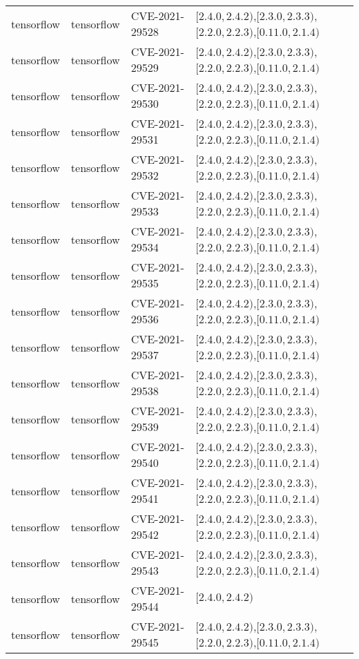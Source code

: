 \begin{tabular}{llll}
tensorflow & tensorflow & CVE-2021-29528 & $[2.4.0,2.4.2)$,$[2.3.0,2.3.3)$,$[2.2.0,2.2.3)$,$[0.11.0,2.1.4)$ \\
tensorflow & tensorflow & CVE-2021-29529 & $[2.4.0,2.4.2)$,$[2.3.0,2.3.3)$,$[2.2.0,2.2.3)$,$[0.11.0,2.1.4)$ \\
tensorflow & tensorflow & CVE-2021-29530 & $[2.4.0,2.4.2)$,$[2.3.0,2.3.3)$,$[2.2.0,2.2.3)$,$[0.11.0,2.1.4)$ \\
tensorflow & tensorflow & CVE-2021-29531 & $[2.4.0,2.4.2)$,$[2.3.0,2.3.3)$,$[2.2.0,2.2.3)$,$[0.11.0,2.1.4)$ \\
tensorflow & tensorflow & CVE-2021-29532 & $[2.4.0,2.4.2)$,$[2.3.0,2.3.3)$,$[2.2.0,2.2.3)$,$[0.11.0,2.1.4)$ \\
tensorflow & tensorflow & CVE-2021-29533 & $[2.4.0,2.4.2)$,$[2.3.0,2.3.3)$,$[2.2.0,2.2.3)$,$[0.11.0,2.1.4)$ \\
tensorflow & tensorflow & CVE-2021-29534 & $[2.4.0,2.4.2)$,$[2.3.0,2.3.3)$,$[2.2.0,2.2.3)$,$[0.11.0,2.1.4)$ \\
tensorflow & tensorflow & CVE-2021-29535 & $[2.4.0,2.4.2)$,$[2.3.0,2.3.3)$,$[2.2.0,2.2.3)$,$[0.11.0,2.1.4)$ \\
tensorflow & tensorflow & CVE-2021-29536 & $[2.4.0,2.4.2)$,$[2.3.0,2.3.3)$,$[2.2.0,2.2.3)$,$[0.11.0,2.1.4)$ \\
tensorflow & tensorflow & CVE-2021-29537 & $[2.4.0,2.4.2)$,$[2.3.0,2.3.3)$,$[2.2.0,2.2.3)$,$[0.11.0,2.1.4)$ \\
tensorflow & tensorflow & CVE-2021-29538 & $[2.4.0,2.4.2)$,$[2.3.0,2.3.3)$,$[2.2.0,2.2.3)$,$[0.11.0,2.1.4)$ \\
tensorflow & tensorflow & CVE-2021-29539 & $[2.4.0,2.4.2)$,$[2.3.0,2.3.3)$,$[2.2.0,2.2.3)$,$[0.11.0,2.1.4)$ \\
tensorflow & tensorflow & CVE-2021-29540 & $[2.4.0,2.4.2)$,$[2.3.0,2.3.3)$,$[2.2.0,2.2.3)$,$[0.11.0,2.1.4)$ \\
tensorflow & tensorflow & CVE-2021-29541 & $[2.4.0,2.4.2)$,$[2.3.0,2.3.3)$,$[2.2.0,2.2.3)$,$[0.11.0,2.1.4)$ \\
tensorflow & tensorflow & CVE-2021-29542 & $[2.4.0,2.4.2)$,$[2.3.0,2.3.3)$,$[2.2.0,2.2.3)$,$[0.11.0,2.1.4)$ \\
tensorflow & tensorflow & CVE-2021-29543 & $[2.4.0,2.4.2)$,$[2.3.0,2.3.3)$,$[2.2.0,2.2.3)$,$[0.11.0,2.1.4)$ \\
tensorflow & tensorflow & CVE-2021-29544 & $[2.4.0,2.4.2)$ \\
tensorflow & tensorflow & CVE-2021-29545 & $[2.4.0,2.4.2)$,$[2.3.0,2.3.3)$,$[2.2.0,2.2.3)$,$[0.11.0,2.1.4)$ \\

\end{tabular}
